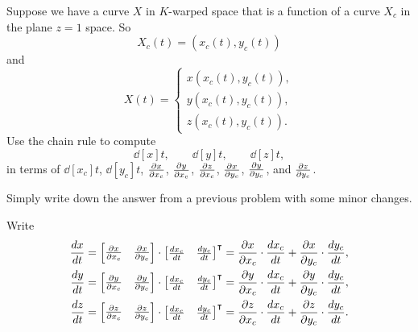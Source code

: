 \documentclass{ximera}
\begin{document}
\begin{problem}
Suppose we have a curve $X$ in $K$-warped space that is a function of
a curve $X_c$ in the plane $z=1$ space. So
\[
X_c(t) = \left( x_c(t),y_c(t)\right)
\]
and
\[
X(t) = 
\begin{cases}
  x(x_c(t),y_c(t)),\\
  y(x_c(t),y_c(t)),\\
  z(x_c(t),y_c(t)).
\end{cases}
\]
Use the chain rule to compute
\[
\dd[x]{t}, \qquad \dd[y]{t}, \qquad \dd[z]{t},
\]
in terms of $\dd[x_c]{t}$, $\dd[y_c]{t}$, $\pp[x]{x_c}$,
$\pp[y]{x_c}$, $\pp[z]{x_c}$, $\pp[x]{y_c}$, $\pp[y]{y_c}$,
and $\pp[z]{y_c}$.
  \begin{hint}
  Simply write down the answer from a previous problem with some minor
  changes.
  \end{hint}
  \begin{freeResponse}
  Write
  \begin{align*}
    \dd[x]{t} &= \begin{bmatrix}\pp[x]{x_c} & \pp[x]{y_c}\end{bmatrix}\cdot\begin{bmatrix}\dd[x_c]{t} & \dd[y_c]{t}\end{bmatrix}^\transpose = \pp[x]{x_c}\cdot\dd[x_c]{t}+\pp[x]{y_c}\cdot\dd[y_c]{t},   \\
    \dd[y]{t} &= \begin{bmatrix}\pp[y]{x_c} & \pp[y]{y_c}\end{bmatrix}\cdot\begin{bmatrix}\dd[x_c]{t} & \dd[y_c]{t}\end{bmatrix}^\transpose = \pp[y]{x_c}\cdot\dd[x_c]{t}+\pp[y]{y_c}\cdot\dd[y_c]{t},   \\
    \dd[z]{t} &= \begin{bmatrix}\pp[z]{x_c} & \pp[z]{y_c}\end{bmatrix}\cdot\begin{bmatrix}\dd[x_c]{t} & \dd[y_c]{t}\end{bmatrix}^\transpose = \pp[z]{x_c}\cdot\dd[x_c]{t}+\pp[z]{y_c}\cdot\dd[y_c]{t}.  
  \end{align*}
\end{freeResponse}
\end{problem}
\end{document}
